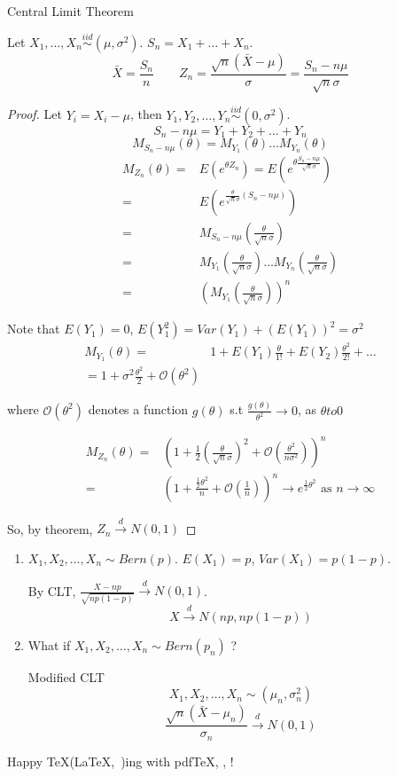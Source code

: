 \begin{theo}
Central Limit Theorem

Let $X_1,\dots,X_n \overset{iid}{\sim} (\mu,\sigma^2)$. $S_n=X_1+\dots+X_n$.
\[\bar{X}=\frac{S_n}{n} \qquad Z_n=\frac{\sqrt{n}(\bar{X}-\mu)}{\sigma}=\frac{S_n-n\mu}{\sqrt{n}\sigma}\]

\begin{proof}
Let $Y_i=X_i-\mu$, then $Y_1,Y_2,\dots,Y_n\overset{iid}{\sim} (0,\sigma^2)$.
\[S_n-n\mu=Y_1+Y_2+\dots+Y_n\]
\[M_{S_n-n\mu}(\theta)=M_{Y_1}(\theta)\dots M_{Y_n}(\theta)\]
\begin{align*}
M_{Z_n}(\theta)= & E(e^{\theta Z_n})=E\left(e^{\theta \frac{S_n-n\mu}{\sqrt{n}\sigma}} \right) \\
= & E\left(e^{\frac{\theta}{\sqrt{n}\sigma}(S_n-n\mu)} \right) \\
= & M_{S_n-n\mu} \left(\frac{\theta}{\sqrt{n}\sigma}\right) \\
= & M_{Y_1}\left(\frac{\theta}{\sqrt{n}\sigma}\right) \dots M_{Y_n}\left(\frac{\theta}{\sqrt{n}\sigma}\right)\\
= & \left(M_{Y_1}\left(\frac{\theta}{\sqrt{n}\sigma}\right)\right)^n
\end{align*}

Note that $E(Y_1)=0$, $E(Y_1^2)=Var(Y_1)+(E(Y_1))^2=\sigma^2$
\begin{align*}
M_{Y_1}(\theta) =& 1+ E(Y_1) \frac{\theta}{1!} + E(Y_2) \frac{\theta^2}{2!} +\dots \\
= 1+ \sigma^2 \frac{\theta^2}{2} + \mathcal{O}(\theta^2)
\end{align*}

where $\mathcal{O}(\theta^2)$ denotes a function $g(\theta)$ s.t $\frac{g(\theta)}{\theta^2}\to 0$, as $\theta to 0$

\begin{align*}
M_{Z_n}(\theta) =& \left(		1+\frac{1}{2}\left(\frac{\theta}{\sqrt{n}\sigma}\right)^2+\mathcal{O}\left(\frac{\theta^2}{n\sigma^2}\right)		\right)^n \\
= & \left(		1+\frac{\frac{1}{2}\theta^2}{n}+\mathcal{O}\left(\frac{1}{n}\right)		\right)^n \longrightarrow e^{\frac{1}{2}\theta^2} \text{ as } n\to\infty
\end{align*}

So, by theorem, $Z_n\overset{d}{\longrightarrow}N(0,1)$
\end{proof}
\end{theo}

\begin{enumerate}
\item $X_1,X_2,\dots,X_n \sim Bern(p)$. $E(X_1)=p$, $Var(X_1)=p(1-p)$.

By CLT, $\frac{X-np}{\sqrt{np(1-p)}}\overset{d}{\longrightarrow}N(0,1)$.
\[X \overset{d}{\longrightarrow}N(np,np(1-p))\]

\item What if $X_1,X_2,\dots,X_n \sim Bern(p_n)$ ?

Modified CLT
\[X_1,X_2,\dots,X_n \sim (\mu_n,\sigma_n^2)\]
\[\frac{\sqrt{n}(\bar{X}-\mu_n)}{\sigma_n} \overset{d}{\longrightarrow} N(0,1)\]
\end{enumerate}

\newpage
Happy \TeX(\LaTeX,~\LaTeXe)ing with pdf\TeX, \XeTeX, \LuaTeX!